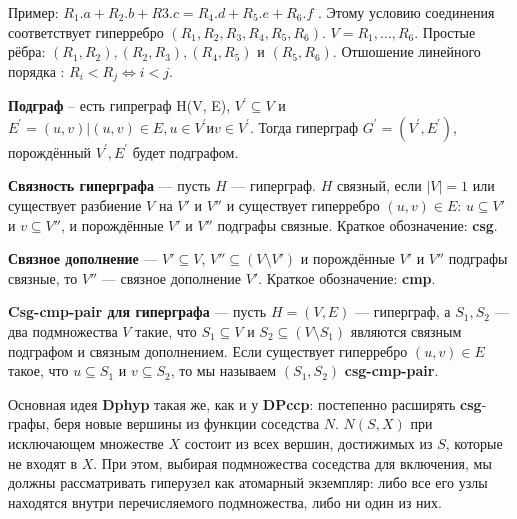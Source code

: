\documentclass[12pt]{article}
\begin{document}
\begin{flushleft}
\begin{center}
\end{center}

Пример: 
$R_1.a + R_2.b + R3.c = R_4.d + R_5.e + R_6.f$ . Этому условию соединения 
соответствует гиперребро  $({R_1, R_2, R_3}, {R_4, R_5, R_6})$. $V = {R_1, \dots , R_6}$. 
Простые рёбра:  $({R_1}, {R_2}), ({R_2}, {R_3}), ({R_4}, {R_5})$ и 
$({R_5}, {R_6})$. Отшошение линейного порядка : $R_i < R_j \Leftrightarrow  i < j$.

\textbf{Подграф} -- есть гипреграф H(V, E), $V^{'} \subseteq V$ и $E^{'} = {(u, v) | (u, v) \in E, u \in V^{'} и v \in V^{'}}$.
Тогда гиперграф $G^{'} = (V^{'}, E^{'})$, порождённый $V^{'}, E^{'}$ будет подграфом.
\newline

\textbf{Связность гиперграфа} — пусть $H$ — гиперграф. $H$ связный, если $|V| = 1$ или существует разбиение $V$ на $V'$ и $V''$ и существует гиперребро $(u, v) \in E$: $u \subseteq V'$ и $v \subseteq V''$, и порождённые $V'$ и $V''$ подграфы связные. Краткое обозначение: \textbf{csg}.

\textbf{Связное дополнение} — $V' \subseteq V$, $V'' \subseteq (V \setminus V')$ и порождённые $V'$ и $V''$ подграфы связные, то $V''$ — связное дополнение $V'$. Краткое обозначение: \textbf{cmp}.

\textbf{Csg-cmp-pair для гиперграфа} — пусть $H = (V, E)$ — гиперграф, а $S_1, S_2$ — два подмножества $V$ такие, что $S_1 \subseteq V$ и $S_2 \subseteq (V \setminus S_1)$ являются связным подграфом и связным дополнением. Если существует гиперребро $(u, v) \in E$ такое, что $u \subseteq S_1$ и $v \subseteq S_2$, то мы называем $(S_1, S_2)$ \textbf{csg-cmp-pair}.

Основная идея \textbf{Dphyp} такая же, как и у \textbf{DPccp}: постепенно расширять \textbf{csg}-графы, беря новые вершины из функции соседства $N$. $N(S, X)$ при исключающем множестве $X$ состоит из всех вершин, достижимых из $S$, которые не входят в $X$. При этом, выбирая подмножества соседства для включения, мы должны рассматривать гиперузел как атомарный экземпляр: либо все его узлы находятся внутри перечисляемого подмножества, либо ни один из них.


\end{flushleft}
\end{document}
